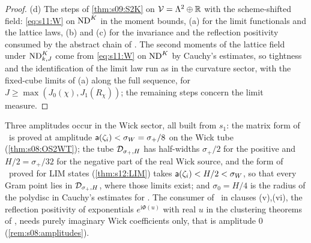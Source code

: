 \begin{proof}
(d) The steps of \cref{thm:s09:S2K} on $\mathcal V=\Lambda^2\oplus\mathbb R$ with the scheme-shifted field: \eqref{eq:s11:W} on $\mathrm{ND}^{K}$ in the moment bounds, (a) for the limit functionals and the lattice laws, (b) and (c) for the invariance and the reflection positivity consumed by the abstract chain of \cite{SymPhase}. The second moments of the lattice field under $\mathrm{ND}^{K}_{k,J}$ come from \eqref{eq:s11:W} on $\mathrm{ND}^{K}$ by Cauchy's estimates, so tightness and the identification of the limit law run as in the curvature sector, with the fixed-cube limits of (a) along the full sequence, for $J\ge\max(J_0(\chi),J_1(R_\chi))$; the remaining steps concern the limit measure.
\end{proof}



\begin{remark}\label{rem:s13:amplitudes}
Three amplitudes occur in the Wick sector, all built from $s_1$: the matrix form of \OSt\ is proved at amplitude $\mathsf a(\zeta_i)<\sigma_W=\sigma_+/8$ on the Wick tube (\cref{thm:s08:OS2WT}); the tube $\mathcal D_{\sigma_+,H}$ has half-widths $\sigma_+/2$ for the positive and $H/2=\sigma_+/32$ for the negative part of the real Wick source, and the form of \OSt\ proved for LIM states (\cref{thm:s12:LIM}) takes $\mathsf a(\zeta_i)<H/2<\sigma_W$, so that every Gram point lies in $\mathcal D_{\sigma_+,H}$, where those limits exist; and $\sigma_0=H/4$ is the radius of the polydisc in Cauchy's estimates for \Ezz. The consumer of \OSt\ in clauses (v),(vi), the reflection positivity of exponentials $e^{\mathrm i\Phi(u)}$ with real $u$ in the clustering theorems of \cite{SymPhase}, needs purely imaginary Wick coefficients only, that is amplitude $0$ (\cref{rem:s08:amplitudes}).
\end{remark}

